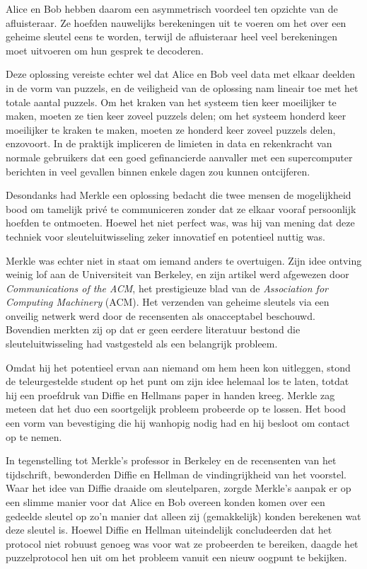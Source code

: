 \documentclass[
  a5paper,
  smalldemyvopaper,11pt,twoside,onecolumn,openright,extrafontsizes,
hidelinks]{memoir}
\begin{document}
Alice en Bob hebben daarom een asymmetrisch voordeel ten opzichte van de
afluisteraar. Ze hoefden nauwelijks berekeningen uit te voeren om het
over een geheime sleutel eens te worden, terwijl de afluisteraar heel
veel berekeningen moet uitvoeren om hun gesprek te decoderen.

Deze oplossing vereiste echter wel dat Alice en Bob veel data met elkaar
deelden in de vorm van puzzels, en de veiligheid van de oplossing nam
lineair toe met het totale aantal puzzels. Om het kraken van het systeem
tien keer moeilijker te maken, moeten ze tien keer zoveel puzzels delen;
om het systeem honderd keer moeilijker te kraken te maken, moeten ze
honderd keer zoveel puzzels delen, enzovoort. In de praktijk impliceren
de limieten in data en rekenkracht van normale gebruikers dat een goed
gefinancierde aanvaller met een supercomputer berichten in veel gevallen
binnen enkele dagen zou kunnen ontcijferen.

Desondanks had Merkle een oplossing bedacht die twee mensen de
mogelijkheid bood om tamelijk privé te communiceren zonder dat ze elkaar
vooraf persoonlijk hoefden te ontmoeten. Hoewel het niet perfect was,
was hij van mening dat deze techniek voor sleuteluitwisseling zeker
innovatief en potentieel nuttig was.

Merkle was echter niet in staat om iemand anders te overtuigen. Zijn
idee ontving weinig lof aan de Universiteit van Berkeley, en zijn
artikel werd afgewezen door \emph{Communications of the ACM}, het
prestigieuze blad van de \emph{Association for Computing Machinery}
(ACM). Het verzenden van geheime sleutels via een onveilig netwerk werd
door de recensenten als onacceptabel beschouwd. Bovendien merkten zij op
dat er geen eerdere literatuur bestond die sleuteluitwisseling had
vastgesteld als een belangrijk probleem.

Omdat hij het potentieel ervan aan niemand om hem heen kon uitleggen,
stond de teleurgestelde student op het punt om zijn idee helemaal los te
laten, totdat hij een proefdruk van Diffie en Hellmans paper in handen
kreeg. Merkle zag meteen dat het duo een soortgelijk probleem probeerde
op te lossen. Het bood een vorm van bevestiging die hij wanhopig nodig
had en hij besloot om contact op te nemen.

In tegenstelling tot Merkle's professor in Berkeley en de recensenten
van het tijdschrift, bewonderden Diffie en Hellman de vindingrijkheid
van het voorstel. Waar het idee van Diffie draaide om sleutelparen,
zorgde Merkle's aanpak er op een slimme manier voor dat Alice en Bob
overeen konden komen over een gedeelde sleutel op zo'n manier dat alleen
zij (gemakkelijk) konden berekenen wat deze sleutel is. Hoewel Diffie en
Hellman uiteindelijk concludeerden dat het protocol niet robuust genoeg
was voor wat ze probeerden te bereiken, daagde het puzzelprotocol hen
uit om het probleem vanuit een nieuw oogpunt te bekijken.
\end{document}
